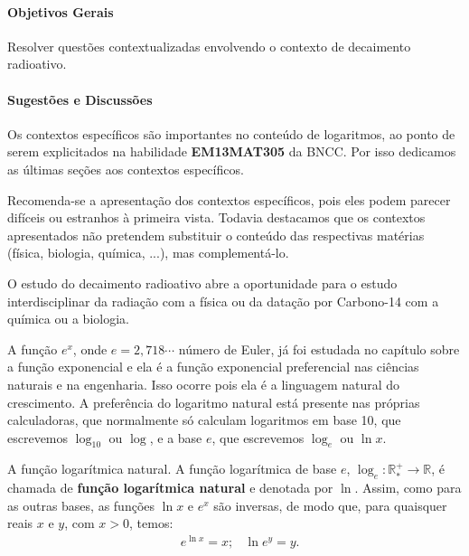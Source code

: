 \begin{texto}
{\def\currentcolor{session4}
\setlength\parskip{5pt}
	\paragraph{Objetivos Gerais}
	Resolver questões contextualizadas envolvendo o contexto de decaimento radioativo.

	\paragraph{Sugestões e Discussões}
	Os contextos específicos são importantes no conteúdo de logaritmos, ao ponto de serem explicitados na habilidade \textbf{EM13MAT305} da BNCC. Por isso dedicamos as últimas seções aos contextos específicos.

	Recomenda-se a apresentação dos contextos específicos, pois eles podem parecer difíceis ou estranhos à primeira vista. Todavia destacamos que os contextos apresentados não pretendem substituir o conteúdo das respectivas matérias (física, biologia, química, ...), mas complementá-lo.

	O estudo do decaimento radioativo abre a oportunidade para o estudo interdisciplinar da radiação com a física ou da datação por Carbono-14 com a química ou a biologia.

}
\end{texto}



A função $e^x$, onde $e=2{,}718\cdots$ número de Euler, já foi estudada no capítulo sobre a função exponencial e ela é a função exponencial preferencial nas ciências naturais e na engenharia. Isso ocorre pois ela é a linguagem natural do crescimento. A preferência do logaritmo natural está presente nas próprias calculadoras, que normalmente só calculam logaritmos em base 10, que escrevemos $\log_{10}$ ou $\log$, e a base $e$, que escrevemos $\log_e$ ou $\ln x$.

\begin{observationtitle}{A função logarítmica natural.}
A função logarítmica de base $e$, $\log_e: \mathbb{R}^+_* \to \mathbb{R}$, é chamada de \textbf{função logarítmica natural} e denotada por $\ln$. Assim, como para as outras bases, as funções $\ln x$ e $e^x$ são inversas, de modo que, para quaisquer reais $x$ e $y$, com $x>0$, temos:
\begin{align*}
& e^{\ln x} = x;
& \ln e^y = y.
\end{align*}
\end{observationtitle}

